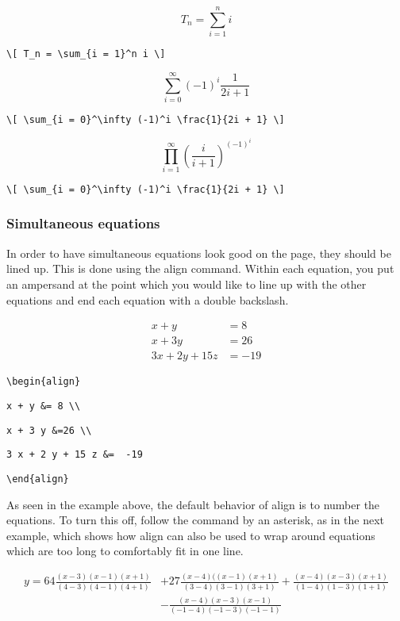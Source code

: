 \[ T_n = \sum_{i = 1}^n i \]

\verb'\[ T_n = \sum_{i = 1}^n i \]'

\[ \sum_{i = 0}^\infty (-1)^i \frac{1}{2i + 1} \]

\verb'\[ \sum_{i = 0}^\infty (-1)^i \frac{1}{2i + 1} \]'

\[ \prod_{i = 1}^\infty \left(\frac{i}{i + 1}\right)^{{(-1)}^i} \]

\verb'\[ \sum_{i = 0}^\infty (-1)^i \frac{1}{2i + 1} \]'

\subsubsection{Simultaneous equations}

In order to have simultaneous equations look good on the page, they should be lined up.  This is done using the align command.  Within each equation, you put an ampersand at the point which you would like to line up with the other equations and end each equation with a double backslash. 

\medskip

\begin{align}
x + y &= 8 \\
x + 3 y &=26 \\
3 x + 2 y + 15 z &=  -19 
\end{align}

\smallskip

\verb"\begin{align}"

\verb"x + y &= 8 \\"

\verb"x + 3 y &=26 \\"

\verb"3 x + 2 y + 15 z &=  -19"

\verb"\end{align}"

\bigskip

As seen in the example above, the default behavior of align is to number the equations.  To turn this off, follow the command by an asterisk, as in the next example, which shows how align can also be used to wrap around equations which are too long to comfortably fit in one line.

\begin{align*}
y = 64 \frac{(x-3)(x-1)(x+1)}{(4-3)(4-1)(4+1)} 
&+ 27 \frac{(x-4)((x-1)(x+1)}{(3-4)(3-1)(3+1)}
+ \frac{(x-4)(x-3)(x+1)}{(1-4)(1-3)(1+1)} \\
&- \frac{(x-4)(x-3)(x-1)}{(-1-4)(-1-3)(-1-1)}
\end{align*}


